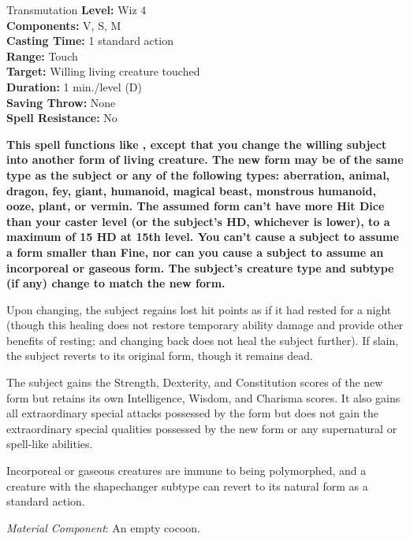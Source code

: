 {Transmutation}
{
	\textbf{Level:}
	Wiz 4\\
	\textbf{Components:}
	V, S, M\\
	\textbf{Casting Time:}
	1 standard action\\
	\textbf{Range:}
	Touch\\
	\textbf{Target:}
	Willing living creature touched\\
	\textbf{Duration:}
	1 min./level (D)\\
	\textbf{Saving Throw:}
	None\\
	\textbf{Spell Resistance:}
	No\\
}
{
	\textbf{	This spell functions like , except that you change the willing subject into another form of living creature. The new form may be of the same type as the subject or any of the following types: aberration, animal, dragon, fey, giant, humanoid, magical beast, monstrous humanoid, ooze, plant, or vermin. The assumed form can't have more Hit Dice than your caster level (or the subject's HD, whichever is lower), to a maximum of 15 HD at 15th level. You can't cause a subject to assume a form smaller than Fine, nor can you cause a subject to assume an incorporeal or gaseous form. The subject's creature type and subtype (if any) change to match the new form.}

	Upon changing, the subject regains lost hit points as if it had rested for a night (though this healing does not restore temporary ability damage and provide other benefits of resting; and changing back does not heal the subject further). If slain, the subject reverts to its original form, though it remains dead.

	The subject gains the Strength, Dexterity, and Constitution scores of the new form but retains its own Intelligence, Wisdom, and Charisma scores. It also gains all extraordinary special attacks possessed by the form but does not gain the extraordinary special qualities possessed by the new form or any supernatural or spell-like abilities.

	Incorporeal or gaseous creatures are immune to being polymorphed, and a creature with the shapechanger subtype can revert to its natural form as a standard action.

	\textit{Material Component}:
	An empty cocoon.

}
